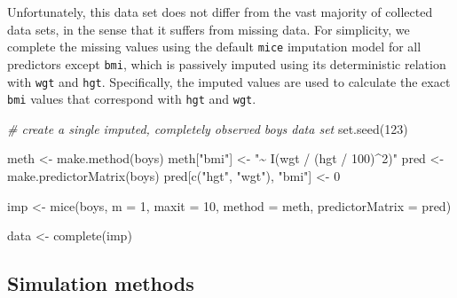 \documentclass[psych,article,submit,moreauthors,pdftex]{mdpi}
\newenvironment{Shaded}{\begin{snugshade}}{\end{snugshade}}
\newcommand{\AttributeTok}[1]{\textcolor[rgb]{0.77,0.63,0.00}{#1}}
\newcommand{\CommentTok}[1]{\textcolor[rgb]{0.56,0.35,0.01}{\textit{#1}}}
\newcommand{\DecValTok}[1]{\textcolor[rgb]{0.00,0.00,0.81}{#1}}
\newcommand{\FunctionTok}[1]{\textcolor[rgb]{0.00,0.00,0.00}{#1}}
\newcommand{\NormalTok}[1]{#1}
\newcommand{\OtherTok}[1]{\textcolor[rgb]{0.56,0.35,0.01}{#1}}
\newcommand{\StringTok}[1]{\textcolor[rgb]{0.31,0.60,0.02}{#1}}
\begin{document}
Unfortunately, this data set does not differ from the vast majority of
collected data sets, in the sense that it suffers from missing data. For
simplicity, we complete the missing values using the default
\texttt{mice} imputation model for all predictors except \texttt{bmi},
which is passively imputed using its deterministic relation with
\texttt{wgt} and \texttt{hgt}. Specifically, the imputed values are used
to calculate the exact \texttt{bmi} values that correspond with
\texttt{hgt} and \texttt{wgt}.

\begin{Shaded}
\begin{Highlighting}[]
\CommentTok{\# create a single imputed, completely observed \textasciigrave{}boys\textasciigrave{} data set}
\FunctionTok{set.seed}\NormalTok{(}\DecValTok{123}\NormalTok{)}

\NormalTok{meth }\OtherTok{\textless{}{-}} \FunctionTok{make.method}\NormalTok{(boys)}
\NormalTok{meth[}\StringTok{"bmi"}\NormalTok{] }\OtherTok{\textless{}{-}} \StringTok{"\textasciitilde{} I(wgt / (hgt / 100)\^{}2)"}
\NormalTok{pred }\OtherTok{\textless{}{-}} \FunctionTok{make.predictorMatrix}\NormalTok{(boys)}
\NormalTok{pred[}\FunctionTok{c}\NormalTok{(}\StringTok{"hgt"}\NormalTok{, }\StringTok{"wgt"}\NormalTok{), }\StringTok{"bmi"}\NormalTok{] }\OtherTok{\textless{}{-}} \DecValTok{0}

\NormalTok{imp }\OtherTok{\textless{}{-}} \FunctionTok{mice}\NormalTok{(boys, }
            \AttributeTok{m =} \DecValTok{1}\NormalTok{,}
            \AttributeTok{maxit =} \DecValTok{10}\NormalTok{,}
            \AttributeTok{method =}\NormalTok{ meth,}
            \AttributeTok{predictorMatrix =}\NormalTok{ pred)}

\NormalTok{data }\OtherTok{\textless{}{-}} \FunctionTok{complete}\NormalTok{(imp)}
\end{Highlighting}
\end{Shaded}

\hypertarget{simulation-methods}{%
\subsection{Simulation methods}\label{simulation-methods}}
\end{document}
